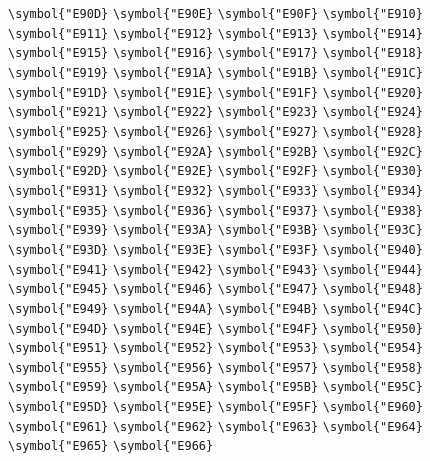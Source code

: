 \documentclass{ctexbook}
\begin{document}
 \verb|\symbol{"E90D}|  \verb|\symbol{"E90E}|  \verb|\symbol{"E90F}|  \verb|\symbol{"E910}|  \verb|\symbol{"E911}|  \verb|\symbol{"E912}|  \verb|\symbol{"E913}|  \verb|\symbol{"E914}|  \verb|\symbol{"E915}|  \verb|\symbol{"E916}|  \verb|\symbol{"E917}|  \verb|\symbol{"E918}|  \verb|\symbol{"E919}|  \verb|\symbol{"E91A}|  \verb|\symbol{"E91B}|  \verb|\symbol{"E91C}|  \verb|\symbol{"E91D}|  \verb|\symbol{"E91E}|  \verb|\symbol{"E91F}|  \verb|\symbol{"E920}|  \verb|\symbol{"E921}|  \verb|\symbol{"E922}|  \verb|\symbol{"E923}|  \verb|\symbol{"E924}|  \verb|\symbol{"E925}|  \verb|\symbol{"E926}|  \verb|\symbol{"E927}|  \verb|\symbol{"E928}|  \verb|\symbol{"E929}|  \verb|\symbol{"E92A}|  \verb|\symbol{"E92B}|  \verb|\symbol{"E92C}|  \verb|\symbol{"E92D}|  \verb|\symbol{"E92E}|  \verb|\symbol{"E92F}|  \verb|\symbol{"E930}|  \verb|\symbol{"E931}|  \verb|\symbol{"E932}|  \verb|\symbol{"E933}|  \verb|\symbol{"E934}|  \verb|\symbol{"E935}|  \verb|\symbol{"E936}|  \verb|\symbol{"E937}|  \verb|\symbol{"E938}|  \verb|\symbol{"E939}|  \verb|\symbol{"E93A}|  \verb|\symbol{"E93B}|  \verb|\symbol{"E93C}|  \verb|\symbol{"E93D}|  \verb|\symbol{"E93E}|  \verb|\symbol{"E93F}|  \verb|\symbol{"E940}|  \verb|\symbol{"E941}|  \verb|\symbol{"E942}|  \verb|\symbol{"E943}|  \verb|\symbol{"E944}|  \verb|\symbol{"E945}|  \verb|\symbol{"E946}|  \verb|\symbol{"E947}|  \verb|\symbol{"E948}|  \verb|\symbol{"E949}|  \verb|\symbol{"E94A}|  \verb|\symbol{"E94B}|  \verb|\symbol{"E94C}|  \verb|\symbol{"E94D}|  \verb|\symbol{"E94E}|  \verb|\symbol{"E94F}|  \verb|\symbol{"E950}|  \verb|\symbol{"E951}|  \verb|\symbol{"E952}|  \verb|\symbol{"E953}|  \verb|\symbol{"E954}|  \verb|\symbol{"E955}|  \verb|\symbol{"E956}|  \verb|\symbol{"E957}|  \verb|\symbol{"E958}|  \verb|\symbol{"E959}|  \verb|\symbol{"E95A}|  \verb|\symbol{"E95B}|  \verb|\symbol{"E95C}|  \verb|\symbol{"E95D}|  \verb|\symbol{"E95E}|  \verb|\symbol{"E95F}|  \verb|\symbol{"E960}|  \verb|\symbol{"E961}|  \verb|\symbol{"E962}|  \verb|\symbol{"E963}|  \verb|\symbol{"E964}|  \verb|\symbol{"E965}|  \verb|\symbol{"E966}| 
\end{document}
